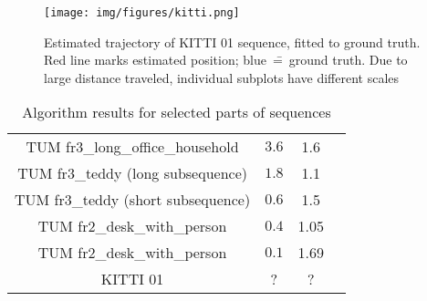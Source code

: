 \begin{figure}[ht]
	\centering\texttt{[image: img/figures/kitti.png]}
	\caption{ Estimated trajectory of KITTI 01 sequence, fitted to ground truth. Red line marks estimated position; blue~\==~ground truth. Due to large distance traveled, individual subplots have different scales }
	\label{fig:kitti_3}
\end{figure}








\begin{table}[ht]
	\centering
	
	\begin{threeparttable}
		\caption{Algorithm results for selected parts of sequences}
		\label{tab:drift}
		
		\begin{tabularx}{1.0\textwidth}{C{0.4} C{0.2} C{0.1} C{0.2}}
			\toprule
			 &  &  &  \\
			\midrule
			TUM fr3\_long\_office\_household & $3.6$ & 1.6 \\
			TUM fr3\_teddy (long subsequence) & $1.8$ & 1.1 \\
			TUM fr3\_teddy (short subsequence) & $0.6$ & 1.5 \\
			TUM fr2\_desk\_with\_person & $0.4$ & 1.05 \\
			TUM fr2\_desk\_with\_person & $0.1$ & 1.69 \\
			KITTI 01 & ? & ? \\
			\bottomrule
		\end{tabularx}
		
	\end{threeparttable}
\end{table}






